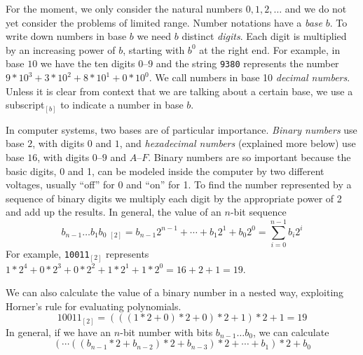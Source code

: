 For the moment, we only consider the natural numbers $0, 1, 2, \ldots$
and we do not yet consider the problems of limited range.  Number
notations have a \emph{base} $b$.  To write down numbers in base $b$
we need $b$ distinct \emph{digits}.  Each digit is multiplied by an
increasing power of $b$, starting with $b^0$ at the right end.  For
example, in base $10$ we have the ten digits $0$--$9$ and the string
\lstinline'9380' represents the number $9* 10^3 + 3* 10^2 + 8* 10^1 + 0 *
10^0$.  We call numbers in base 10 \emph{decimal numbers}.
Unless it is clear from context that we are talking about a
certain base, we use a subscript$_{[b]}$ to indicate a number
in base $b$.

In computer systems, two bases are of particular importance.
\emph{Binary numbers} use base $2$, with digits $0$ and $1$,
and \emph{hexadecimal numbers} (explained more below) use base
$16$, with digits $0$--$9$ and $A$--$F$.  Binary numbers are so
important because the basic digits, 0 and 1, can be modeled inside
the computer by two different voltages, usually ``off'' for 0
and ``on'' for 1.  To find the number represented by a sequence
of binary digits we multiply each digit by the appropriate power
of 2 and add up the results. In general, the value of an $n$-bit sequence
$$
b_{n-1}\ldots b_1 b_0\;{}_{[2]} = b_{n-1} 2^{n-1} + \cdots + b_1 2^1 + b_0 2^0
 = \sum_{i=0}^{n-1} b_i 2^i
$$
For example, \lstinline'10011'$_{[2]}$ represents $1* 2^4 + 0* 2^3+
0* 2^2 + 1* 2^1 + 1* 2^0 = 16 + 2 + 1 = 19$.

We can also calculate the value of a binary number in a nested way,
exploiting Horner's rule for evaluating polynomials.
$$
10011_{[2]} = (((1 * 2 + 0)* 2+0)* 2 + 1) * 2+ 1 = 19
$$
In general, if we have an $n$-bit number with bits $b_{n-1}\ldots
b_0$, we can calculate
$$
(\cdots((b_{n-1}* 2 + b_{n-2})* 2 + b_{n-3})* 2 + \cdots + b_1)* 2 + b_0
$$



